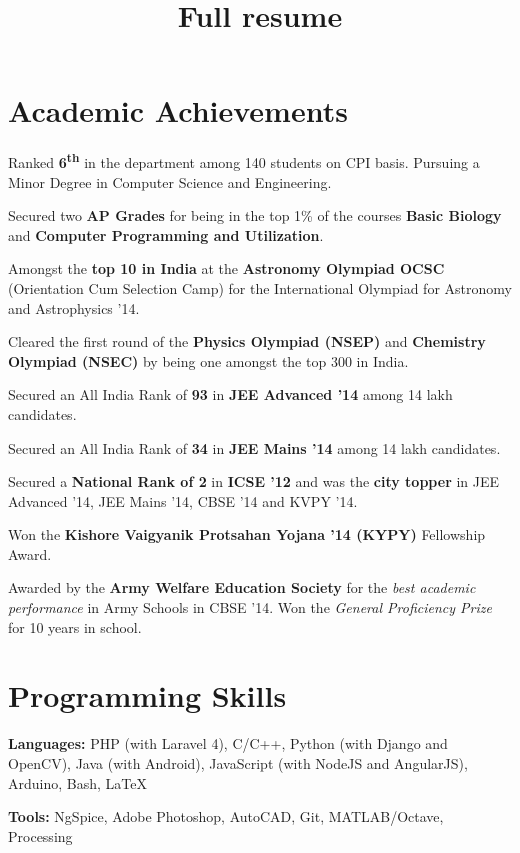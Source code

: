 \documentclass[11pt]{resume}
\title{Full resume}
\newcommand{\memph}[1]{#1}
\begin{document}
\vspace*{20mm}
\vspace{-2em}
\begin{resume}
\section{\mysidestyle Academic Achievements}
\begin{list2}
\item Ranked \textbf {6\textsuperscript{th}} in the department among 140 students on CPI basis. \memph Pursuing a Minor Degree in Computer Science and Engineering.
\item Secured two \textbf {AP Grades} for being in the top 1\% of the courses \textbf{Basic Biology} and \textbf{Computer Programming and Utilization}.
\item Amongst the \textbf{top 10 in India} at the \textbf {Astronomy Olympiad OCSC} (Orientation Cum Selection Camp) for the International Olympiad for Astronomy and Astrophysics '14.
\item Cleared the first round of the \textbf{Physics Olympiad (NSEP)} and \textbf{Chemistry Olympiad (NSEC)} by being one amongst the top 300 in India.
\item Secured an All India Rank of \textbf{93} in \textbf{JEE Advanced '14} among 14 lakh candidates.
\item Secured an All India Rank of \textbf{34} in \textbf{JEE Mains '14} among 14 lakh candidates.
\item Secured a \textbf{National Rank of 2} in \textbf{ICSE '12} and was the \textbf{city topper} in  JEE Advanced '14, JEE Mains '14, CBSE '14 and KVPY '14.
\item Won the \textbf {Kishore Vaigyanik Protsahan Yojana '14 (KYPY)} Fellowship Award.
\item Awarded by the \textbf {Army Welfare Education Society} for the \textit{best academic performance} in Army Schools in CBSE '14. Won the \textit{General Proficiency Prize} for 10 years in school. 
\end{list2}

\section{\mysidestyle Programming Skills}
\begin{list2}
\item \textbf{Languages:} PHP (with Laravel 4), C/C++, Python (with Django and OpenCV), Java (with Android), JavaScript (with NodeJS and AngularJS), Arduino, Bash, \LaTeX
\item \textbf{Tools:} NgSpice, Adobe Photoshop, AutoCAD, Git, MATLAB/Octave, Processing
\end{list2}

\end{resume}
\end{document}
